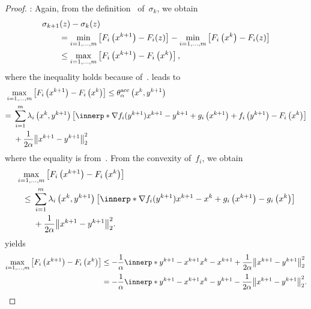 \documentclass[../main]{subfiles}
\begin{document}
\begin{proof}
    :
    Again, from the definition~ of~$\sigma_k$, we obtain
    \begin{align}
            \MoveEqLeft \sigma_{k + 1}(z) - \sigma_k(z) \\
            &=  \min_{i = 1, \dots, m}\left[ F_i\left(x^{k + 1}\right) - F_i(z) \right] - \min_{i = 1, \dots, m}\left[ F_i\left(x^k\right) - F_i(z) \right]  \\
        &\le \max_{i = 1, \dots, m}\left[ F_i\left(x^{k + 1}\right) - F_i\left(x^k\right) \right]
    ,\end{align} 
    where the inequality holds because of~.
     leads to
    \begin{align}
        \MoveEqLeft[1] \max_{i = 1, \dots, m} \left[ F_i\left( x^{k + 1} \right) - F_i\left( x^k \right) \right] \le \theta^\acc_\alpha\left( x^k, y^{k + 1} \right) \\
        ={}& \sum_{i = 1}^{m} \lambda_i\left( x^k, y^{k + 1} \right) \left[ \innerp*{\nabla f_i(y^{k + 1})}{x^{k + 1} - y^{k + 1}} + g_i\left( x^{k + 1} \right) + f_i\left( y^{k + 1} \right) - F_i\left( x^k \right) \right] \\
        &+ \frac{1}{2 \alpha} \norm*{x^{k + 1} - y^{k + 1}}_2^2
    \end{align}
    where the equality is from~.
    From the convexity of~$f_i$, we obtain
    \begin{align}
        \MoveEqLeft  \max_{i = 1, \dots, m} \left[ F_i\left( x^{k + 1} \right) - F_i\left( x^k \right) \right] \\
        \le{}& \sum_{i = 1}^{m} \lambda_i\left( x^k, y^{k + 1} \right) \left[ \innerp*{\nabla f_i(y^{k + 1})}{x^{k + 1} - x^k} + g_i\left( x^{k + 1} \right) - g_i\left( x^k \right) \right] \\
        &+ \frac{1}{2 \alpha} \norm*{x^{k + 1} - y^{k + 1}}_2^2
    .\end{align}
     yields
    \begin{align}
        \max_{i = 1, \dots, m} \left[ F_i\left( x^{k + 1} \right) - F_i\left( x^k \right) \right] 
        &\le - \frac{1}{\alpha} \innerp*{y^{k + 1} - x^{k + 1}}{x^k - x^{k + 1}} + \frac{1}{2 \alpha} \norm*{x^{k + 1} - y^{k + 1}}_2^2 \\
        &= - \frac{1}{\alpha} \innerp*{y^{k + 1} - x^{k + 1}}{x^k - y^{k + 1}} - \frac{1}{2 \alpha} \norm*{x^{k + 1} - y^{k + 1}}_2^2
    .\end{align}
\end{proof}
\end{document}

